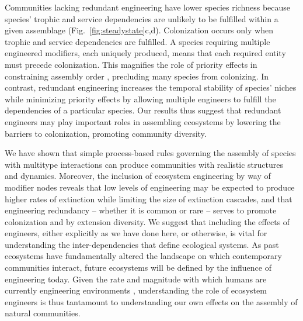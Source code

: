 \documentclass[twocolumn,preprintnumbers,amsmath,amssymb,superscriptaddress,linenumbers]{revtex4-1}
\newcommand{\rev}[1]{\textcolor{crimson}{#1}}
\begin{document}
Communities lacking redundant engineering have lower species richness because species' trophic and service dependencies are unlikely to be fulfilled within a given assemblage (Fig.\ \ref{fig:steadystate}c,d).
Colonization occurs only when trophic and service dependencies are fulfilled.
A species requiring multiple engineered modifiers, each uniquely produced, means that each required entity must precede colonization.
This magnifies the role of priority effects in constraining assembly order \cite{Fukami2015}, precluding many species from colonizing.
In contrast, redundant engineering increases the temporal stability of species' niches while minimizing priority effects by allowing multiple engineers to fulfill the dependencies of a particular species.
Our results thus suggest that redundant engineers may play important roles in assembling ecosystems by lowering the barriers to colonization, promoting community diversity.

We have shown that simple process-based rules governing the assembly of species with multitype interactions can produce communities with realistic structures and dynamics.
Moreover, the inclusion of ecosystem engineering by way of modifier nodes reveals that low levels of engineering may be expected to produce higher rates of extinction while limiting the size of extinction cascades, and that engineering redundancy -- whether it is common or rare -- serves to promote colonization and by extension diversity.
We suggest that including the effects of engineers, either explicitly as we have done here, or otherwise, is vital for understanding the inter-dependencies that define ecological systems.
As past ecosystems have fundamentally altered the landscape on which contemporary communities interact, future ecosystems will be defined by the influence of engineering today.
Given the rate and magnitude with which humans are currently engineering environments \cite{Corlett2015}, understanding the role of ecosystem engineers is thus tantamount to understanding our own effects on the assembly of natural communities.\\
\end{document}
